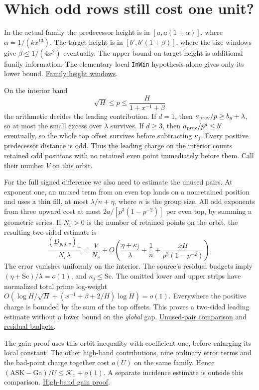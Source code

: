 \documentclass[12pt,letterpaper]{article}
\newcommand{\orig}[3]{\href{https://github.com/nousentllc/riemann-hypothesis/blob/40e56bab026552e089d7afcfeff08d2defb9c005/src/#1.lean\#L#2}{#3}}
\newcommand{\pagepart}[1]{\clearpage\section{#1}}
\begin{document}
\pagepart{Which odd rows still cost one unit?}
In the actual family the predecessor height is in \([a,a(1+\alpha)]\), where \(\alpha=1/(kx^{13})\). The target height is in \([b',b'(1+\beta)]\), where the size windows give \(\beta\le1/(4x^2)\) eventually. The upper bound on target height is additional family information. The elementary local \texttt{InWin} hypothesis alone gives only its lower bound. \orig{Formalism/SharpRestriction/FamCore}{123}{Family height windows}.

On the interior band
\[
 \sqrt H\le p\le \frac{H}{1+x^{-1}+\beta}
\]
the arithmetic decides the leading contribution. If \(d=1\), then \(a_{\rm prev}/p\ge b_y+\lambda\), so at most the small excess over \(\lambda\) survives. If \(d\ge3\), then \(a_{\rm prev}/p^d\le b'\) eventually, so the whole top offset survives before subtracting \(\kappa_j\). Every positive predecessor distance is odd. Thus the leading charge on the interior counts retained odd positions with no retained even point immediately before them. Call their number \(V\) on this orbit.

For the full signed difference we also need to estimate the unused pairs. At exponent one, an unused term from an even top lands on a nonretained position and uses a thin fill, at most \(\lambda/n+\eta\), where \(n\) is the group size. All odd exponents from three upward cost at most \(2a/[p^3(1-p^{-2})]\) per even top, by summing a geometric series. If \(N_v>0\) is the number of retained points on the orbit, the resulting two-sided estimate is
\[
 \frac{(D_{p,j,v})_+}{N_v\lambda}
       =\frac{V}{N_v}
        +O\!\left(\frac{\eta+\kappa_j}{\lambda}
                    +\frac1n+\frac{xH}{p^3(1-p^{-2})}\right).
\]
The error vanishes uniformly on the interior. The source's residual budgets imply \((\eta+\mathrm{Sc})/\lambda=o(1)\), and \(\kappa_j\le\mathrm{Sc}\). The omitted lower and upper strips have normalized total prime log-weight \(O(\log H/\sqrt H+(x^{-1}+\beta+2/H)\log H)=o(1)\). Everywhere the positive charge is bounded by the sum of the top offsets. This proves a two-sided leading estimate without a lower bound on the \emph{global} gap. \orig{Formalism/SharpRestriction/GrowthBounds/LogarithmicSums/PartnerCountOfCentral}{136}{Unused-pair comparison} and \orig{Formalism/SizeWindowBrackets/ChainSlopeWindows/OneLeThresholdMulPowers}{444}{residual budgets}.

The gain proof uses this orbit inequality with coefficient one, before enlarging its local constant. The other high-band contributions, nine ordinary error terms and the bad-point charge together cost \(o(U)\) on the same family. Hence \((\mathrm{ASK}-\mathrm{Ga})/U\le\mathcal K_x+o(1)\). A separate incidence estimate is outside this comparison. \orig{Formalism/SharpRestriction/GrowthBounds/LogarithmicSums/PartnerCountOfCentral}{696}{High-band gain proof}.
\end{document}

